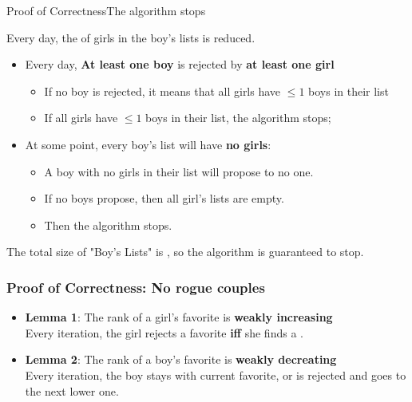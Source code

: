 \begin{frame}{Proof of Correctness}{The algorithm stops}

  {\larger
    Every day, the  of girls in
    the boy's lists is reduced.

    \bigskip

    \begin{itemize}
      \item Every day, {\bf At least one boy} is rejected by {\bf at least one girl}
      \begin{itemize}
        \item If no boy is rejected, it means that all girls have $\leq 1$ boys in their list
        \item If all girls have $\leq 1$ boys in their list, the algorithm stops;
      \end{itemize}
      \item At some point, every boy's list will have {\bf no girls}:
      \begin{itemize}
        \item A boy with no girls in their list will propose to no one.
        \item If no boys propose, then all girl's lists are empty.
        \item Then the algorithm stops.
      \end{itemize}
    \end{itemize}

    \bigskip

    The total size of "Boy's Lists" is , so the algorithm is guaranteed to stop.
  }
\end{frame}

\begin{frame}
  \frametitle{Proof of Correctness: No rogue couples}

  {\larger

    \begin{itemize}
    \item {\bf Lemma 1}: The rank of a girl's favorite is {\bf weakly
      increasing}\\ Every iteration, the girl rejects a favorite {\bf
      iff} she finds a .

      \bigskip

    \item {\bf Lemma 2}: The rank of a boy's favorite is {\bf weakly
      decreating}\\ Every iteration, the boy stays with current
      favorite, or is rejected and goes to the next lower one.

    \end{itemize}
  }
\end{frame}

